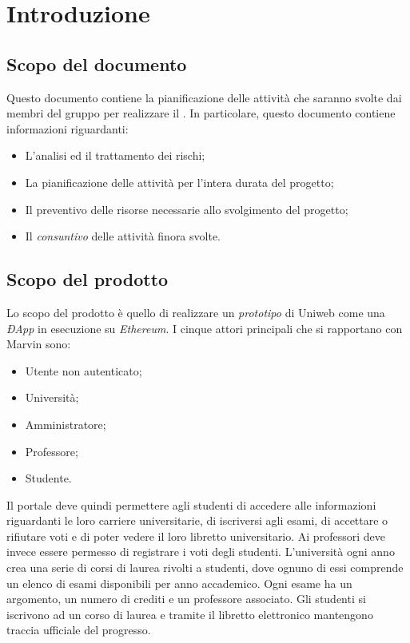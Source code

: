 \newpage
\section{Introduzione}
\subsection{Scopo del documento}
Questo documento contiene la pianificazione delle attività che saranno svolte dai membri del gruppo \Gruppo{} per realizzare il \NomeProgetto. In particolare, questo documento contiene informazioni riguardanti:

\begin{itemize}
	\item L'analisi ed il trattamento dei rischi;
	\item La pianificazione delle attività per l'intera durata del progetto;
	\item Il preventivo delle risorse necessarie allo svolgimento del progetto;
	\item Il \emph{consuntivo} delle attività finora svolte.
\end{itemize}

\subsection{Scopo del prodotto}
Lo scopo del prodotto è quello di realizzare un \emph{prototipo} di Uniweb come una \emph{ÐApp} in esecuzione su \emph{Ethereum}. I cinque attori principali che si rapportano con Marvin sono:
\begin{itemize}
	\item Utente non autenticato; 
	\item Università;
	\item Amministratore;
	\item Professore;
	\item Studente.
\end{itemize} 
Il portale deve quindi permettere agli studenti di accedere alle informazioni riguardanti le loro carriere universitarie, di iscriversi agli esami, di accettare o rifiutare voti e di poter vedere il loro libretto universitario.
Ai professori deve invece essere permesso di registrare i voti degli studenti.
L'università ogni anno crea una serie di corsi di laurea rivolti a studenti, dove ognuno di essi comprende un elenco di esami disponibili per anno accademico. Ogni esame ha un argomento, un numero di crediti e un professore associato. Gli studenti si iscrivono ad un corso di laurea e tramite il libretto elettronico mantengono traccia ufficiale del progresso.

